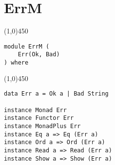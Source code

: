 \section{ErrM}
\begin{center}
\line(1,0){450}
\end{center}
\begin{verbatim}
module ErrM (
    Err(Ok, Bad)
) where
\end{verbatim}
\begin{center}
\line(1,0){450}
\end{center}
\begin{verbatim}
data Err a = Ok a | Bad String

instance Monad Err
instance Functor Err
instance MonadPlus Err
instance Eq a => Eq (Err a)
instance Ord a => Ord (Err a)
instance Read a => Read (Err a)
instance Show a => Show (Err a)
\end{verbatim}
